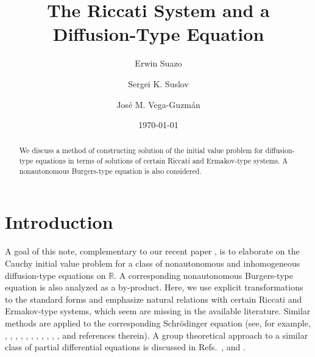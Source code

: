 \documentclass[12pt,reqno]{amsart}
\theoremstyle{plain}
\numberwithin{equation}{section}
\begin{document}
\title[The Riccati System]{The Riccati System and a Diffusion-Type Equation}
\author{Erwin Suazo}
\address{Department of Mathematical Sciences, University of Puerto Rico,
Mayaguez, Call Box 9000, Puerto Rico 00681--9000.}
\author{Sergei K. Suslov}
\address{School of Mathematical and Statistical Sciences \& Mathematical,
Computational and Modeling Sciences Center, Arizona State University, Tempe,
AZ 85287--1804, U.S.A.}
\author{Jos\'{e} M. Vega-Guzm\'{a}n}
\address{Mathematical, Computational and Modeling Sciences Center, Arizona
State University, Tempe, AZ 85287--1904, U.S.A.}
\date{\today }

\begin{abstract}
We discuss a method of constructing solution of the initial value problem
for diffusion-type equations in terms of solutions of certain Riccati and
Ermakov-type systems. A nonautonomous Burgers-type equation is also
considered.
\end{abstract}

\maketitle

\section{Introduction}

A goal of this note, complementary to our recent paper \cite{SuazoSusVega10}, is to elaborate on the Cauchy initial value problem for a class of
nonautonomous and inhomogeneous diffusion-type equations on $\mathbb{R}
.$ A corresponding nonautonomous Burgers-type equation is also analyzed as a
by-product. Here, we use explicit transformations to the standard forms and
emphasize natural relations with certain Riccati and Ermakov-type systems,
which seem are missing in the available literature. Similar methods are
applied to the corresponding Schr\"{o}dinger equation (see, for example, 
\cite{Cor-Sot:Lop:Sua:Sus}, \cite{Cor-Sot:Sua:Sus}, \cite{Cor-Sot:Sua:SusInv}, \cite{Cor-Sot:Sus}, \cite{Cor-Sot:SusDPO}, \cite{Lan:Lop:Sus}, \cite{Lan:Sus}, \cite{Lop:Sus}, \cite{Me:Co:Su}, \cite{Suaz:Sus}, \cite{Suslov10}, \cite{Suslov11} and references therein). A group theoretical approach to a
similar class of partial differential equations is discussed in Refs.~\cite{GagWint93}, \cite{Miller77} and \cite{Rosen76}.
\end{document}
